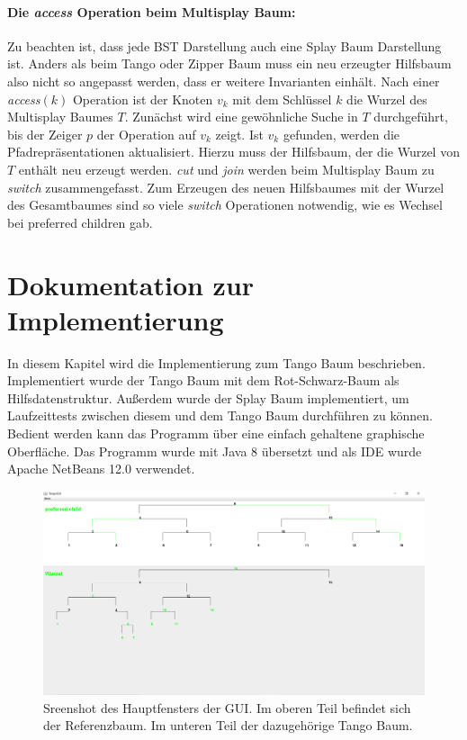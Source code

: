 \documentclass[a4paper,12pt]{article}
\begin{document}
\paragraph{Die \textit{access} Operation beim Multisplay Baum:}
Zu beachten ist, dass jede BST Darstellung auch eine Splay Baum Darstellung ist. Anders als beim Tango oder Zipper Baum muss ein neu erzeugter Hilfsbaum also nicht so angepasst werden, dass er weitere Invarianten einhält. Nach einer \textit{access}$\left(k\right)$ Operation ist der Knoten $v_k$ mit dem Schlüssel $k$ die Wurzel des Multisplay Baumes $T$. Zunächst wird eine gewöhnliche Suche in $T$ durchgeführt, bis der Zeiger $p$ der Operation auf $v_k$ zeigt. Ist $v_k$ gefunden, werden die Pfadrepräsentationen aktualisiert. Hierzu muss der Hilfsbaum, der die Wurzel von $T$ enthält neu erzeugt werden. \textit{cut} und \textit{join} werden beim Multisplay Baum zu \textit{switch} zusammengefasst. Zum Erzeugen des neuen Hilfsbaumes mit der Wurzel des Gesamtbaumes sind so viele \textit{switch} Operationen notwendig, wie es Wechsel bei preferred children gab.  \\

\section{Dokumentation zur Implementierung}
In diesem Kapitel wird die Implementierung zum Tango Baum beschrieben. 
Implementiert wurde der Tango Baum mit dem Rot-Schwarz-Baum als Hilfsdatenstruktur. Außerdem wurde der Splay Baum implementiert, um Laufzeittests zwischen diesem und dem Tango Baum durchführen zu können. Bedient werden kann das Programm über eine einfach gehaltene graphische Oberfläche. Das Programm wurde mit Java 8 übersetzt und als IDE wurde Apache NetBeans 12.0 verwendet. 
\begin{figure}[H]
	\centering
	\includegraphics[width= 1\textwidth]{Medien/laufzeittest/MainGUI}
	\caption{Sreenshot des Hauptfensters der GUI. Im oberen Teil befindet sich der Referenzbaum. Im unteren Teil der dazugehörige Tango Baum.}
	\label{fig:TangoBaumGui}
\end{figure}
\end{document}
